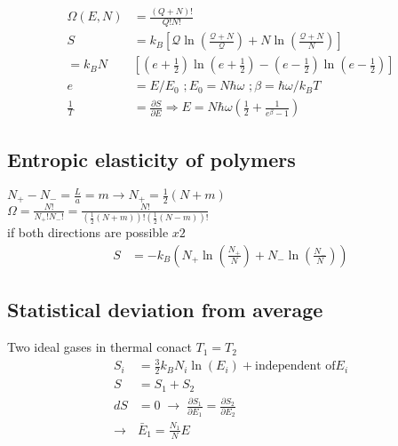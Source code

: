 \begin{equation*}
    \begin{aligned}
        \Omega(E,N) &= \frac{(Q+N)!}{Q!N!} \\
        S &= k_B \left[\mathcal{Q}\ln \left(\frac{\mathcal{Q}+N}{\mathcal{Q}}\right) + N \ln \left(\frac{\mathcal{Q}+N}{N}\right)\right] \\
          = k_B N &\left[(e + \frac{1}{2}) \ln (e + \frac{1}{2})- (e-\frac{1}{2}) \ln (e- \frac{1}{2})\right] \\
          e &= E/E_0 \,\, ; E_0 = N \hbar \omega \,\, ; \beta = \hbar \omega / k_B T \\
          \frac{1}{T} &= \frac{\partial S}{\partial E} \Rightarrow E = N \hbar \omega \left(\frac{1}{2} + \frac{1}{e^\beta -1}\right)
    \end{aligned}
\end{equation*}

\subsection*{Entropic elasticity of polymers}
$ N_+ - N_- = \frac{L}{a} = m \rightarrow N_+ = \frac{1}{2} \left(N + m\right)$\\
$\Omega = \frac{N!}{N_+ ! N_- !} = \frac{N!}{\left(\frac{1}{2}\left(N+m\right)\right)! \left(\frac{1}{2}\left(N-m\right)\right)!}$\\
if both directions are possible $x2$
\begin{equation*}
    \begin{aligned}
        S &= -k_B \left(N_+ \ln \left(\frac{N_+}{N}\right)+N_-\ln\left(\frac{N_-}{N}\right)\right)
    \end{aligned}
\end{equation*}

\subsection*{Statistical deviation from average}
Two ideal gases in thermal conact $T_1 = T_2$ 
\begin{equation*}
    \begin{aligned}
        S_i &= \frac{3}{2} k_B N_i \ln (E_i) + \text{independent of} E_i \\
        S &= S_1 + S_2 \\
        dS &= 0 \; \rightarrow \; \frac{\partial S_1}{\partial E_1} = \frac{\partial S_2}{\partial E_2} \\
        \rightarrow & \bar{E}_1 = \frac{N_1}{N} E
    \end{aligned}
\end{equation*}

